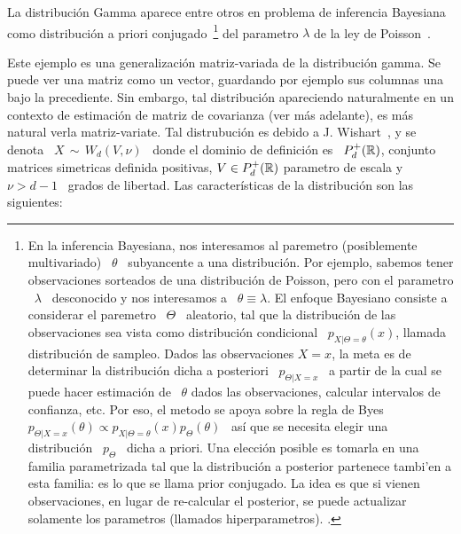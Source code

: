 La distribuci\'on Gamma aparece entre  otros en problema de inferencia Bayesiana
como distribuci\'on a priori conjugado~\footnote{En la inferencia Bayesiana, nos
  interesamos al paremetro (posiblemente  multivariado) \ $\theta$ \ subyancente
  a una  distribuci\'on. Por ejemplo,  sabemos tener observaciones  sorteados de
  una distribuci\'on de Poisson, pero con el parametro \ $\lambda$ \ desconocido
  y nos interesamos a \ $\theta \equiv \lambda$. El enfoque Bayesiano consiste a
  considerar el paremetro  \ $\Theta$ \ aleatorio, tal  que la distribuci\'on de
  las observaciones  sea vista como distribuci\'on condicional  \ $p_{X|\Theta =
    \theta}(x)$, llamada distribuci\'on de sampleo. Dados las observaciones $X =
  x$,  la  meta  es  de  determinar  la  distribuci\'on  dicha  a  posteriori  \
  $p_{\Theta|X =  x}$ \ a  partir de  la cual se  puede hacer estimaci\'on  de \
  $\theta$ dados  las observaciones, calcular intervalos de  confianza, etc. Por
  eso, el metodo se apoya sobre la regla de Byes $p_{\Theta|X=x}(\theta) \propto
  p_{X|\Theta=\theta}(x) p_\Theta(\theta)$  \ as\'i  que se necesita  elegir una
  distribuci\'on  \ $p_\Theta$  \  dicha  a priori.  Una  elecci\'on posible  es
  tomarla en  una familia  parametrizada tal que  la distribuci\'on  a posterior
  partenece tambi’en a esta familia: es lo que se llama prior conjugado. La idea
  es que si vienen observaciones, en lugar de re-calcular el posterior, se puede
  actualizar solamente  los parametros (llamados  hiperparametros). \SZ{Ver nota
    de pie  en el cap  2 a modificar}.\label{Foot:MP:BayesPrior}}  del parametro
$\lambda$ de la ley de Poisson~\cite{Rob07}.





Este ejemplo es una  generalizaci\'on matriz-variada de la distribuci\'on gamma.
Se puede ver  una matriz como un vector, guardando por  ejemplo sus columnas una
bajo la  precediente.  Sin embargo, tal  distribuci\'on apareciendo naturalmente
en un contexto de estimaci\'on de  matriz de covarianza (ver m\'as adelante), es
m\'as   natural  verla   matriz-variate.    Tal  distrubuci\'on   es  debido   a
J. Wishart~\cite{Wis28, toto}, y se denota  \ $X \, \sim \, W_d(V,\nu)$ \ donde
el  dominio de definici\'on  es \  $P_d^+(\mathbb{R})$, conjunto  matrices simetricas
definida positivas, $V  \in P_d^+(\mathbb{R})$ parametro de escala y \  $\nu > d-1$ \
grados  de  libertad.   Las  caracter\'isticas  de  la  distribuci\'on  son  las
siguientes:


